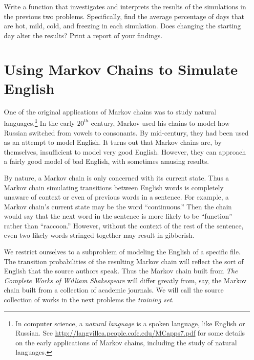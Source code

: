 
\begin{problem} %
Write a function that investigates and interprets the results of the simulations in the previous two problems.
Specifically, find the average percentage of days that are hot, mild, cold, and freezing in each simulation.
Does changing the starting day alter the results?
Print a report of your findings.
\end{problem}

\section*{Using Markov Chains to Simulate English} %
One of the original applications of Markov chains was to study natural languages.\footnote{In computer science, a \emph{natural language} is a spoken language, like English or Russian. See \url{http://langvillea.people.cofc.edu/MCapps7.pdf} for some details on the early applications of Markov chains, including the study of natural languages.}
In the early $20^{th}$ century, Markov used his chains to model how Russian switched from vowels to consonants.
By mid-century, they had been used as an attempt to model English.
It turns out that Markov chains are, by themselves, insufficient to model very good English.
However, they can approach a fairly good model of bad English, with sometimes amusing results.

By nature, a Markov chain is only concerned with its current state.
Thus a Markov chain simulating transitions between English words is completely unaware of context or even of previous words in a sentence.
For example, a Markov chain's current state may be the word ``continuous.''
Then the chain would say that the next word in the sentence is more likely to be ``function'' rather than ``raccoon.''
However, without the context of the rest of the sentence, even two likely words stringed together may result in gibberish.

We restrict ourselves to a subproblem of modeling the English of a specific file.
The transition probabilities of the resulting Markov chain will reflect the sort of English that the source authors speak.
Thus the Markov chain built from \emph{The Complete Works of William Shakespeare} will differ greatly from, say, the Markov chain built from a collection of academic journals.
We will call the source collection of works in the next problems the \emph{training set}.

